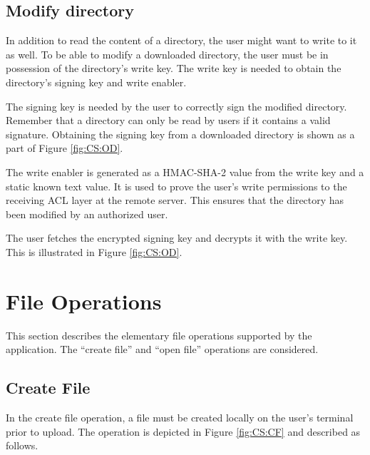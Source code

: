 \documentclass[pdftex,english,10pt,b5paper,twoside]{book}
\begin{document}
\subsection{Modify directory}
In addition to read the content of a directory, the user might want to write to it as well. 
To be able to modify a downloaded directory, the user must be in possession of
the directory's write key. The write key is needed to obtain the directory's
signing key and write enabler. 

The signing key is needed by the user to correctly sign the
modified directory. Remember that a directory can only be read by users if it
contains a valid signature. Obtaining the signing key from a downloaded
directory is shown as a part of Figure \ref{fig:CS:OD}.

The write enabler is generated as a HMAC-SHA-2 value from the write key and a
static known text value. It is used to prove the user's write permissions to the
receiving ACL layer at the remote server. This ensures that the directory has
been modified by an authorized user.

The user fetches the encrypted signing key and decrypts it with the
write key. This is illustrated in Figure \ref{fig:CS:OD}.


\section{File Operations}
This section describes the elementary file operations supported by the 
application. The ``create file'' and ``open file'' operations are considered.

\subsection{Create File}
In the create file operation, a file must be created locally on the user's terminal
prior to upload. The operation is depicted in Figure \ref{fig:CS:CF} and
described as follows.
\end{document}
